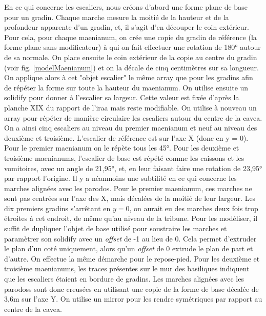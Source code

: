 En ce qui concerne les escaliers, nous créons d'abord une forme plane de base pour un gradin. Chaque marche mesure la moitié de la hauteur et de la profondeur apparente d'un gradin, et, il s'agit d'en découper le coin extérieur. Pour cela, pour chaque \gls{maenianum}, on crée une copie du gradin de référence (la forme plane sans modificateur) à qui on fait effectuer une rotation de 180° autour de sa normale. On place ensuite le coin extérieur de la copie au centre du gradin (voir fig. \ref{modelMaenianum}) et on la décale de cinq centimètres sur sa longueur. On applique alors à cet "objet escalier" le même \gls{array} que pour les gradins afin de répéter la forme sur toute la hauteur du  \gls{maenianum}. On utilise ensuite un \gls{solidify} pour donner à l'escalier sa largeur. Cette valeur est fixée d'après la planche XIX du rapport de l'\gls{iraa} \cite[Pl. XIX]{orangePl} mais reste modifiable. On utilise à nouveau un \gls{array} pour répéter de manière circulaire les escaliers autour du centre de la \gls{cavea}. On a ainsi cinq escaliers au niveau du premier \gls{maenianum} et neuf au niveau des deuxième et troisième. L'escalier de référence est sur l'axe X (donc en y = 0). Pour le premier \gls{maenianum} on le répète tous les 45°. Pour les deuxième et troisième \glspl{maenianum}, l'escalier de base est répété comme les caissons et les vomitoires, avec un angle de 21,95°, et, en leur faisant faire une rotation de 23,95° par rapport l'origine. Il y a néanmoins une subtilité en ce qui concerne les marches alignées avec les \gls{parodos}. Pour le premier \gls{maenianum}, ces marches ne sont pas centrées sur l'axe des X, mais décalées de la moitié de leur largeur. Les dix premiers gradins s'arrêtant en $y = 0$, on aurait eu des marches deux fois trop étroites à cet endroit, de même qu'au niveau de la tribune. Pour les modéliser, il suffit de dupliquer l'objet de base utilisé pour soustraire les marches et paramètrer son \gls{solidify} avec un \textit{offset} de -1 au lieu de 0. Cela permet d'extruder le plan d'un coté uniquement, alors qu'un \textit{offset} de 0 extrude le plan de part et d'autre. On effectue la même démarche pour le repose-pied. Pour les deuxième et troisième \glspl{maenianum}, les traces présentes sur le mur des basiliques indiquent que les escaliers étaient en bordure de gradins. Les marches alignées avec les \glspl{parodos} sont donc creusées en utilisant une copie de la forme de base décalée de 3,6m sur l'axe Y. On utilise un \gls{mirror} pour les rendre symétriques par rapport au centre de la \gls{cavea}.

